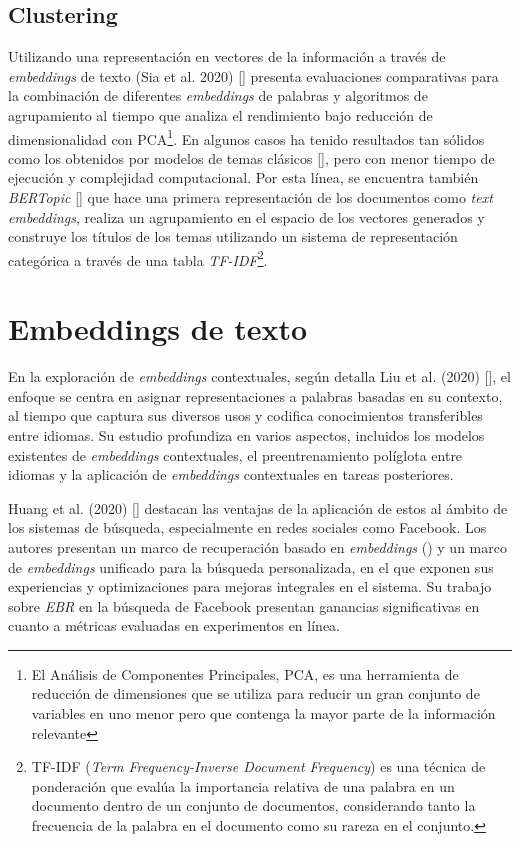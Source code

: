     \subsection{Clustering}
    Utilizando una representación en vectores de la información a través de \emph{embeddings} de texto (Sia et al. 2020) [\cite{sia2020tired}] presenta evaluaciones comparativas para la combinación de diferentes \emph{embeddings} de palabras y algoritmos de agrupamiento al tiempo que analiza el rendimiento bajo reducción de dimensionalidad con PCA\footnote{El Análisis de Componentes Principales, PCA, es una herramienta de reducción de dimensiones que se utiliza para reducir un gran conjunto de variables en uno menor pero que contenga la mayor parte de la información relevante}. En algunos casos ha tenido resultados tan sólidos como los obtenidos por modelos de temas clásicos [\cite{sia2020tiredResults}], pero con menor tiempo de ejecución y complejidad computacional. 
    Por esta línea, se encuentra también \emph{BERTopic} [\cite{bertopic}] que hace una primera representación de los documentos como \emph{text embeddings}, realiza un agrupamiento en el espacio de los vectores generados y construye los títulos de los temas utilizando un sistema de representación categórica a través de una tabla \emph{TF-IDF}\footnote{TF-IDF (\emph{Term Frequency-Inverse Document Frequency}) es una técnica de ponderación que evalúa la importancia relativa de una palabra en un documento dentro de un conjunto de documentos, considerando tanto la frecuencia de la palabra en el documento como su rareza en el conjunto.}.

\section{Embeddings de texto}
    En la exploración de \emph{embeddings} contextuales, según detalla Liu et al. (2020) [\cite{liu2020survey}], el enfoque se centra en asignar representaciones a palabras basadas en su contexto, al tiempo que captura sus diversos usos y codifica conocimientos transferibles entre idiomas. Su estudio profundiza en varios aspectos, incluidos los modelos existentes de \emph{embeddings} contextuales, el preentrenamiento políglota entre idiomas y la aplicación de \emph{embeddings} contextuales en tareas posteriores.

    Huang et al. (2020) [\cite{Huang_2020}] destacan las ventajas de la aplicación de estos al ámbito de los sistemas de búsqueda, especialmente en redes sociales como Facebook. Los autores presentan un marco de recuperación basado en \emph{embeddings} () y un marco de \emph{embeddings} unificado para la búsqueda personalizada, en el que exponen sus experiencias y optimizaciones para mejoras integrales en el sistema. Su trabajo sobre \emph{EBR} en la búsqueda de Facebook presentan ganancias significativas en cuanto a métricas evaluadas en experimentos en línea.

